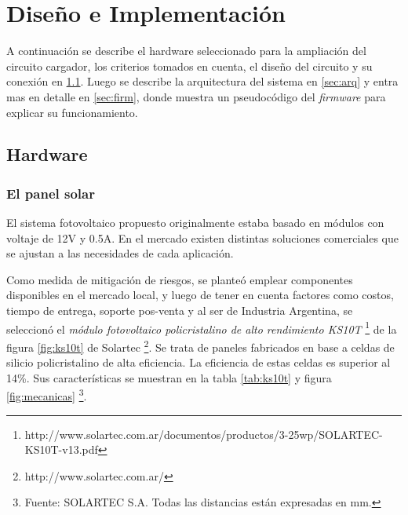 
\chapter{Diseño e Implementación} %

\label{Chapter3} %

A continuación se describe el hardware seleccionado para la ampliación del circuito cargador, los criterios tomados en cuenta, el diseño del circuito y su conexión en \ref{sec:hard}. Luego se describe la arquitectura del sistema en \ref{sec:arq} y entra mas en detalle en \ref{sec:firm}, donde muestra un pseudocódigo del \textit{firmware} para explicar su funcionamiento.

\section{Hardware}
\label{sec:hard}

\subsection{El panel solar}

El sistema fotovoltaico propuesto originalmente estaba basado en módulos con voltaje de 12V y 0.5A. En el mercado existen distintas soluciones comerciales que se ajustan a las necesidades de cada aplicación.

Como medida de mitigación de riesgos, se planteó emplear componentes disponibles en el mercado local, y luego de tener en cuenta factores como costos, tiempo de entrega, soporte pos-venta y al ser de Industria Argentina, se seleccionó el \textit{módulo fotovoltaico policristalino de alto rendimiento KS10T} \footnote{http://www.solartec.com.ar/documentos/productos/3-25wp/SOLARTEC-KS10T-v13.pdf} de la figura \ref{fig:ks10t} de Solartec \footnote{http://www.solartec.com.ar/}. Se trata de paneles fabricados en base a celdas de silicio policristalino de alta eficiencia. La eficiencia de estas celdas es superior al 14\%. Sus características se muestran en la tabla \ref{tab:ks10t} y figura \ref{fig:mecanicas} \footnote{Fuente: SOLARTEC S.A. Todas las distancias están expresadas en mm.}.

